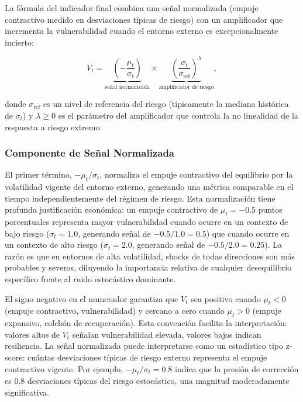 \documentclass[3p,11pt,draft,natbib=false]{elsarticle}
\begin{document}
La fórmula del indicador final combina una señal normalizada (empuje contractivo medido en desviaciones típicas de riesgo) con un amplificador que incrementa la vulnerabilidad cuando el entorno externo es excepcionalmente incierto:

\begin{equation}
V_t = \underbrace{\left(-\frac{\mu_t}{\sigma_t}\right)}_{\text{señal normalizada}} \times \underbrace{\left(\frac{\sigma_t}{\sigma_{\text{ref}}}\right)^\lambda}_{\text{amplificador de riesgo}},
\label{eq:vulnerability_index}
\end{equation}

donde $\sigma_{\text{ref}}$ es un nivel de referencia del riesgo (típicamente la mediana histórica de $\sigma_t$) y $\lambda \geq 0$ es el parámetro del amplificador que controla la no linealidad de la respuesta a riesgo extremo.

\subsubsection{Componente de Señal Normalizada}

El primer término, $-\mu_t/\sigma_t$, normaliza el empuje contractivo del equilibrio por la volatilidad vigente del entorno externo, generando una métrica comparable en el tiempo independientemente del régimen de riesgo. Esta normalización tiene profunda justificación económica: un empuje contractivo de $\mu_t = -0.5$ puntos porcentuales representa mayor vulnerabilidad cuando ocurre en un contexto de bajo riesgo ($\sigma_t = 1.0$, generando señal de $-0.5/1.0 = 0.5$) que cuando ocurre en un contexto de alto riesgo ($\sigma_t = 2.0$, generando señal de $-0.5/2.0 = 0.25$). La razón es que en entornos de alta volatilidad, shocks de todas direcciones son más probables y severos, diluyendo la importancia relativa de cualquier desequilibrio específico frente al ruido estocástico dominante.

El signo negativo en el numerador garantiza que $V_t$ sea positivo cuando $\mu_t < 0$ (empuje contractivo, vulnerabilidad) y cercano a cero cuando $\mu_t > 0$ (empuje expansivo, colchón de recuperación). Esta convención facilita la interpretación: valores altos de $V_t$ señalan vulnerabilidad elevada, valores bajos indican resiliencia. La señal normalizada puede interpretarse como un estadístico tipo z-score: cuántas desviaciones típicas de riesgo externo representa el empuje contractivo vigente. Por ejemplo, $-\mu_t/\sigma_t = 0.8$ indica que la presión de corrección es 0.8 desviaciones típicas del riesgo estocástico, una magnitud moderadamente significativa.
\end{document}

